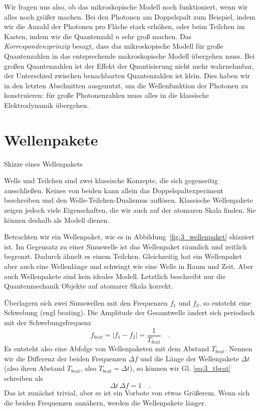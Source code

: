 Wir fragen uns also, ob das mikroskopische Modell noch funktioniert, wenn wir alles noch größer machen. Bei den Photonen am Doppelspalt zum Beispiel, indem wir die Anzahl der Photonen pro Fläche stark erhöhen, oder beim Teilchen im Kasten, indem wir die Quantenzahl $n$ sehr groß machen. Das \emph{Korrespondenzprinzip} besagt, dass das mikroskopische Modell für große Quantenzahlen in das entsprechende makroskopische Modell übergehen muss. Bei großen Quantenzahlen ist der Effekt der Quantisierung nicht mehr wahrnehmbar, der Unterschied zwischen benachbarten Quantenzahlen ist klein. Dies haben wir in den letzten Abschnitten ausgenutzt, um die Wellenfunktion der Photonen zu konstruieren: für große Photonenzahlen muss alles in die klassische Elektrodynamik übergehen.



\section{Wellenpakete}

\begin{marginfigure}
    \caption{Skizze eines Wellenpakets}
    \label{fig:3_wellenpaket}
\end{marginfigure}

Welle und Teilchen sind zwei klassische Konzepte, die sich gegenseitig ausschließen. Keines von beiden kann allein das Doppelspaltexperiment beschreiben und den Welle-Teilchen-Dualismus auflösen. Klassische Wellenpakete zeigen jedoch viele Eigenschaften, die wir auch auf der atomaren Skala finden. Sie können deshalb als Modell dienen.

Betrachten wir ein Wellenpaket, wie es in Abbildung~\ref{fig:3_wellenpaket} skizziert ist. Im Gegensatz zu einer Sinuswelle ist das Wellenpaket räumlich und zeitlich begrenzt. Dadurch ähnelt es einem Teilchen. Gleichzeitig hat ein Wellenpaket aber auch eine Wellenlänge und schwingt wie eine Welle in Raum und Zeit. Aber auch Wellenpakete sind kein ideales Modell. Letztlich beschreibt nur die Quantenmechanik Objekte auf atomarer Skala korrekt.

Überlagern sich zwei Sinuswellen mit den Frequenzen $f_1$ und $f_2$, so entsteht eine Schwebung (engl beating). Die Amplitude der Gesamtwelle ändert sich periodisch mit der Schwebungsfrequenz
\begin{equation}
    f_{beat} = | f_1 - f_2 | = \frac{1}{T_{beat}} \quad . \label{eq:3_tbeat}
\end{equation}
Es entsteht also eine Abfolge von Wellenpaketen mit dem Abstand $T_{beat}$. Nennen wir die Differenz der beiden Frequenzen $\Delta f$ und die Länge der Wellenpakete $\Delta t$ (also ihren Abstand $T_{beat}$, also $T_{beat} = \Delta t$), so können wir Gl. \ref{eq:3_tbeat} schreiben als
\begin{equation}
    \Delta t \, \Delta f = 1 \quad .
\end{equation}
Das ist zunächst trivial, aber es ist ein Vorbote von etwas Größerem. Wenn sich die beiden Frequenzen annähern, werden die Wellenpakete länger.


